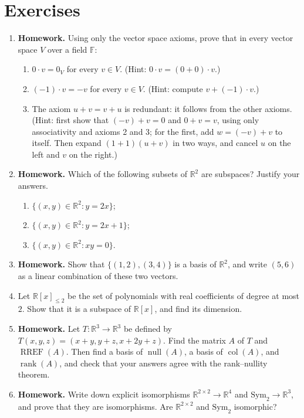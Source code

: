 \documentclass[11pt]{article}
\newcommand{\homework}{\textcolor{red!70!black}{\textbf{Homework.}}}
\theoremstyle{definition}
\theoremstyle{plain}
\theoremstyle{remark}
\DeclareMathOperator{\rank}{rank}
\DeclareMathOperator{\Null}{null}
\DeclareMathOperator{\col}{col}
\DeclareMathOperator{\RREF}{RREF}
\begin{document}
\section{Exercises}\label{sec:exercises}
\begin{enumerate}[leftmargin=*]
	\item\label{ex:axioms} \homework{} Using only the vector space axioms, prove that in every vector space $V$ over a field $\mathbb{F}$:
	\begin{enumerate}
		\item $0 \cdot v = 0_V$ for every $v \in V$. (Hint: $0 \cdot v = (0 + 0) \cdot v$.)
		\item $(-1) \cdot v = -v$ for every $v \in V$. (Hint: compute $v + (-1) \cdot v$.)
		\item The axiom $u + v = v + u$ is redundant: it follows from the other axioms. (Hint: first show that $(-v) + v = 0$ and $0 + v = v$, using only associativity and axioms 2 and 3; for the first, add $w = (-v) + v$ to itself. Then expand $(1 + 1)(u + v)$ in two ways, and cancel $u$ on the left and $v$ on the right.)
	\end{enumerate}
	\item \homework{} Which of the following subsets of $\mathbb{R}^2$ are subspaces? Justify your answers.
	\begin{enumerate}
		\item $\{(x, y) \in \mathbb{R}^2 : y = 2x\}$;
		\item $\{(x, y) \in \mathbb{R}^2 : y = 2x + 1\}$;
		\item $\{(x, y) \in \mathbb{R}^2 : xy = 0\}$.
	\end{enumerate}
	\item \homework{} Show that $\{(1, 2), (3, 4)\}$ is a basis of $\mathbb{R}^2$, and write $(5, 6)$ as a linear combination of these two vectors.
	\item Let $\mathbb{R}[x]_{\leq 2}$ be the set of polynomials with real coefficients of degree at most $2$. Show that it is a subspace of $\mathbb{R}[x]$, and find its dimension.
	\item \homework{} Let $T: \mathbb{R}^3 \to \mathbb{R}^3$ be defined by $T(x, y, z) = (x + y, y + z, x + 2y + z)$. Find the matrix $A$ of $T$ and $\RREF(A)$. Then find a basis of $\Null(A)$, a basis of $\col(A)$, and $\rank(A)$, and check that your answers agree with the rank--nullity theorem.
	\item \homework{} Write down explicit isomorphisms $\mathbb{R}^{2 \times 2} \to \mathbb{R}^4$ and $\mathrm{Sym}_2 \to \mathbb{R}^3$, and prove that they are isomorphisms. Are $\mathbb{R}^{2 \times 2}$ and $\mathrm{Sym}_2$ isomorphic?

\end{enumerate}
\end{document}
